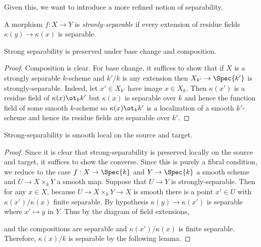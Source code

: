 \documentclass[12pt]{article}
\begin{document}
\begin{rmk}
Given this, we want to introduce a more refined notion of separability.
\end{rmk}

\begin{defn}
A morphism $f : X \to Y$ is \textit{stronly-separable} if every extension of residue fields $\kappa(y) \to \kappa(x)$ is separable.
\end{defn}

\begin{prop}
Strong separability is preserved under base change and composition.
\end{prop}

\begin{proof}
Composition is clear. For base change, it suffices to show that if $X$ is a strongly separable $k$-scheme and $k' / k$ is any extension then $X_{k'} \to \Spec{k'}$ is strongly-separable. Indeed, let $x' \in X_{k'}$ have image $x \in X_{k}$. Then $\kappa(x')$ is a residue field of $\kappa(x) \ot_k k'$ but $\kappa(x)$ is separable over $k$ and hence the function field of some smooth $k$-scheme so $\kappa(x) \ot_k k'$ is a localization of a smooth $k'$-scheme and hence its residue fields are separable over $k'$. 
\end{proof}

\begin{prop}
Strong-separability is smooth local on the source and target.
\end{prop}

\begin{proof}
Since it is clear that strong-separability is preserved locally on the source and target, it suffices to show the converse. Since this is purely a fibral condition, we reduce to the case $f : X \to \Spec{k}$ and $Y \to \Spec{k}$ a smooth scheme and $U \to X \times_k Y$ a smooth map. Suppose that $U \to Y$ is strongly-separable. Then for any $x \in X$, because $U \to X \times_k Y \to X$ is smooth there is a point $x' \in U$ with $\kappa(x') / \kappa(x)$ finite separable. By hypothesis $\kappa(y) \to \kappa(x')$ is separable where $x' \mapsto y$ in $Y$. Thus by the diagram of field extensions,
\begin{center}
\end{center}
and the compositions are separable and $\kappa(x') / \kappa(x)$ is finite separable. Therefore, $\kappa(x) / k$ is separable by the following lemma.
\end{proof}
\end{document}

